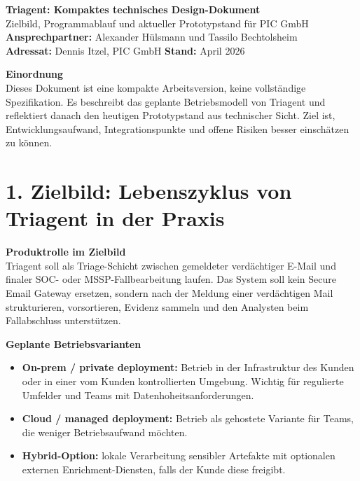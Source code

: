 \documentclass[10pt,a4paper]{article}
\begin{document}
\begin{center}
{\Large \textbf{Triagent: Kompaktes technisches Design-Dokument}}\\[0.15em]
{\large Zielbild, Programmablauf und aktueller Prototypstand für PIC GmbH}\\[0.35em]
\textbf{Ansprechpartner:} Alexander Hülsmann und Tassilo Bechtolsheim\\
\textbf{Adressat:} Dennis Itzel, PIC GmbH \quad
\textbf{Stand:} April 2026
\end{center}
\small

\vspace{0.25em}
\noindent\textbf{Einordnung}\\
Dieses Dokument ist eine kompakte Arbeitsversion, keine vollständige Spezifikation. Es beschreibt das geplante Betriebsmodell von Triagent und reflektiert danach den heutigen Prototypstand aus technischer Sicht. Ziel ist, Entwicklungsaufwand, Integrationspunkte und offene Risiken besser einschätzen zu können.

\section*{1. Zielbild: Lebenszyklus von Triagent in der Praxis}

\noindent\textbf{Produktrolle im Zielbild}\\
Triagent soll als Triage-Schicht zwischen gemeldeter verdächtiger E-Mail und finaler SOC- oder MSSP-Fallbearbeitung laufen. Das System soll kein Secure Email Gateway ersetzen, sondern nach der Meldung einer verdächtigen Mail strukturieren, vorsortieren, Evidenz sammeln und den Analysten beim Fallabschluss unterstützen.

\vspace{0.25em}
\noindent\textbf{Geplante Betriebsvarianten}
\begin{itemize}
  \item \textbf{On-prem / private deployment:} Betrieb in der Infrastruktur des Kunden oder in einer vom Kunden kontrollierten Umgebung. Wichtig für regulierte Umfelder und Teams mit Datenhoheitsanforderungen.
  \item \textbf{Cloud / managed deployment:} Betrieb als gehostete Variante für Teams, die weniger Betriebsaufwand möchten.
  \item \textbf{Hybrid-Option:} lokale Verarbeitung sensibler Artefakte mit optionalen externen Enrichment-Diensten, falls der Kunde diese freigibt.
\end{itemize}
\end{document}
